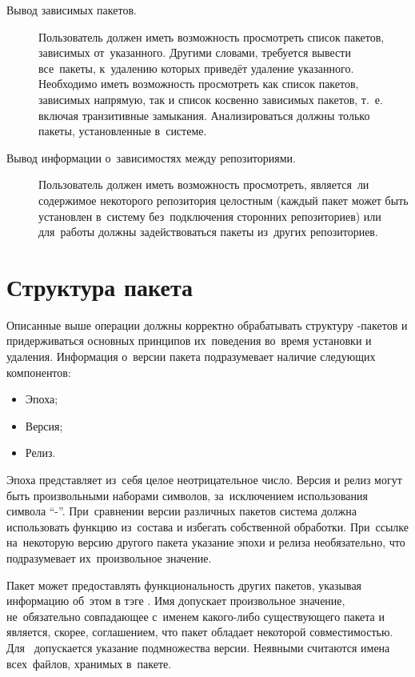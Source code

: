 \begin{description}
\item[Вывод зависимых пакетов.]
Пользователь должен иметь возможность просмотреть список пакетов, зависимых от~указанного.
Другими словами, требуется вывести все~пакеты, к~удалению которых приведёт удаление указанного.
Необходимо иметь возможность просмотреть как список пакетов, зависимых напрямую, 
так и список косвенно зависимых пакетов, т.~е. включая транзитивные замыкания.
Анализироваться должны только пакеты, установленные в~системе.

\item[Вывод информации о~зависимостях между репозиториями.]
Пользователь должен иметь возможность просмотреть, 
является~ли содержимое некоторого репозитория целостным (каждый пакет может быть установлен в~систему без~подключения сторонних репозиториев)
или для~работы должны задействоваться пакеты из~других репозиториев. 

\end{description}

\section{Структура пакета}
\label{pkgstruct}

Описанные выше операции должны корректно обрабатывать структуру -пакетов и 
придерживаться основных принципов их~поведения во~время установки и удаления.
Информация о~версии пакета подразумевает наличие следующих компонентов:

\begin{itemize}
\item {Эпоха;}
\item{Версия;}
\item {Релиз.}
\end{itemize}

Эпоха представляет из~себя целое неотрицательное число. 
Версия и релиз могут быть произвольными наборами символов, за~исключением использования символа ``-''.
При~сравнении версии различных пакетов система должна использовать функцию  из~состава 
и избегать собственной обработки. 
При~ссылке на~некоторую версию другого пакета указание эпохи и релиза необязательно,
что подразумевает их~произвольное значение.

Пакет может предоставлять функциональность других пакетов,
указывая информацию об~этом в тэге .
Имя  допускает произвольное значение, не~обязательно совпадающее с~именем какого-либо существующего пакета
и является, скорее, соглашением, что пакет обладает некоторой совместимостью.
Для~  допускается указание подмножества версии.
Неявными  считаются имена всех~файлов, хранимых в~пакете.

